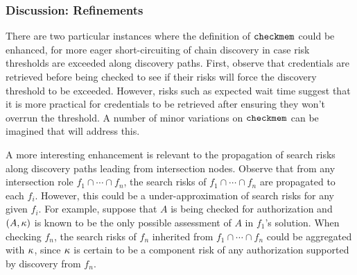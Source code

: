 \subsubsection{Discussion: Refinements} There are two particular 
instances where the definition of $\texttt{checkmem}$ could be enhanced, for
more eager short-circuiting of chain discovery in case risk thresholds
are exceeded along discovery paths. First, observe that credentials
are retrieved before being checked to see if their risks will force
the discovery threshold to be exceeded.  However, risks such as
expected wait time suggest that it is more practical for credentials
to be retrieved after ensuring they won't overrun the threshold. A
number of minor variations on $\texttt{checkmem}$ can be imagined that will
address this.

A more interesting enhancement is relevant to the propagation of
search risks along discovery paths leading from intersection nodes.
Observe that from any intersection role $f_1 \cap \cdots \cap f_n$,
the search risks of $f_1 \cap \cdots \cap f_n$ are propagated to each
$f_i$.  However, this could be a under-approximation of search risks
for any given $f_i$.  For example, suppose that $A$ is being checked
for authorization and $(A,\kappa)$ is known to be the only possible 
assessment of $A$ in $f_1$'s solution.  When checking $f_n$, the
search risks of $f_n$ inherited from $f_1 \cap \cdots \cap f_n$
could be aggregated with $\kappa$, since $\kappa$ is certain to 
be a component risk of any authorization supported by
discovery from $f_n$.  


